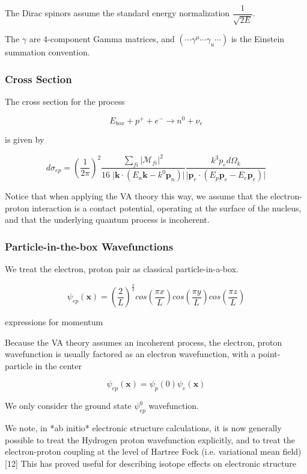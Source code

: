 \documentclass[11pt]{amsart}
\begin{document}
The Dirac spinors assume the standard energy normalization $\dfrac{1}{\sqrt{2E}}$.

The $\gamma$ are 4-component Gamma matrices, and  $(\cdots\gamma^{\mu}\cdots\gamma_{u}\cdots)$ is the Einstein summation convention.


\subsubsection{Cross Section}

The cross section for the process

$$E_{box}+p^{+}+e^{-}\rightarrow n^{0}+\nu_{e}$$

is given by 

$$d\sigma_{ep}=\left(\dfrac{1}{2\pi}\right)^{2}\dfrac{\sum_{fi}\big\vert\mathcal{M}_{fi}\big\vert^{2}}{16\;\big\vert\mathbf{k}\cdot(E{_n}\mathbf{k}-k^{0}\mathbf{p}_{n})\big\vert}\dfrac{k^{3}p_{e}d\Omega_{k}}{\big\vert\mathbf{p}_{e}\cdot(E_{p}\mathbf{p}_{e}-E_{e}\mathbf{p}_{e})\big\vert}$$

Notice that when applying the VA theory this way, we assume that the electron-proton interaction is a contact potential, operating at the surface of the nucleus, and that the underlying quantum process is incoherent.  

\subsubsection{Particle-in-the-box Wavefunctions}


We treat the electron, proton pair as classical particle-in-a-box.

$$\psi_{ep}(\mathbf{x})=\left(\dfrac{2}{L}\right)^{\frac{3}{2}}cos\left(\dfrac{\pi x}{L}\right)cos\left(\dfrac{\pi y}{L}\right)cos\left(\dfrac{\pi z}{L}\right)$$

expressions for momentum

Because the VA theory assumes an incoherent process, the electron, proton wavefunction is usually factored as an electron wavefunction, with a point-particle in the center

$$\psi_{ep}(\mathbf{x})=\psi_{p}(0)\psi_{e}(\mathbf{x})$$

We only consider the  ground state $\psi_{ep}^{0}$ wavefunction.


We note, in *ab initio* electronic structure calculations, it is now generally possible to treat the Hydrogen proton wavefunction explicitly, and to treat the electron-proton coupling at the level of Hartree Fock (i.e. variational mean field) [12] This has proved useful for describing isotope effects on electronic structure
\end{document}
